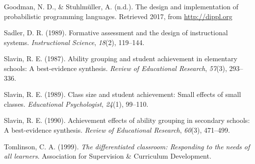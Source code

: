 \documentclass[10pt, letterpaper]{apa6}
\begin{document}
\hypertarget{ref-goodman2017}{}
Goodman, N. D., \& Stuhlmüller, A. (n.d.). The design and implementation
of probabilistic programming languages. Retrieved 2017, from
\url{http://dippl.org}

\hypertarget{ref-sadler1989}{}
Sadler, D. R. (1989). Formative assessment and the design of
instructional systems. \emph{Instructional Science}, \emph{18}(2),
119--144.

\hypertarget{ref-slavin1987}{}
Slavin, R. E. (1987). Ability grouping and student achievement in
elementary schools: A best-evidence synthesis. \emph{Review of
Educational Research}, \emph{57}(3), 293--336.

\hypertarget{ref-slavin1989}{}
Slavin, R. E. (1989). Class size and student achievement: Small effects
of small classes. \emph{Educational Psychologist}, \emph{24}(1),
99--110.

\hypertarget{ref-slavin1990}{}
Slavin, R. E. (1990). Achievement effects of ability grouping in
secondary schools: A best-evidence synthesis. \emph{Review of
Educational Research}, \emph{60}(3), 471--499.

\hypertarget{ref-tomlinson1999}{}
Tomlinson, C. A. (1999). \emph{The differentiated classroom: Responding
to the needs of all learners}. Association for Supervision \& Curriculum
Development.


\end{document}
